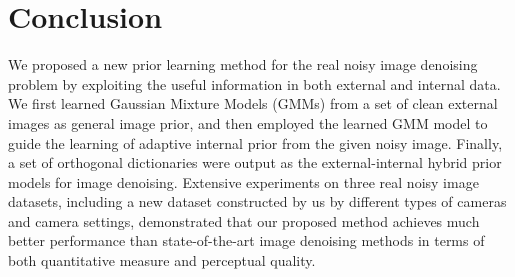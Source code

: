 

\section{Conclusion}

We proposed a new prior learning method for the real noisy image denoising problem by exploiting the useful information in both external and internal data. We first learned Gaussian Mixture Models (GMMs) from a set of clean external images as general image prior, and then employed the learned GMM model to guide the learning of adaptive internal prior from the given noisy image. Finally, a set of orthogonal dictionaries were output as the external-internal hybrid prior models for image denoising. Extensive experiments on three real noisy image datasets, including a new dataset constructed by us by different types of cameras and camera settings, demonstrated that our proposed method achieves much better performance than state-of-the-art image denoising methods in terms of both quantitative measure and perceptual quality.



